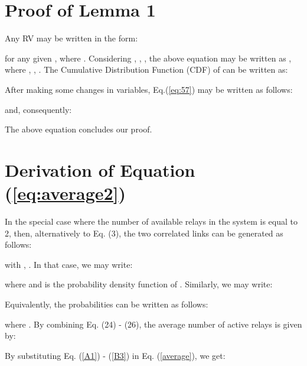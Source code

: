 \documentclass[12pt,draftcls, onecolumn]{IEEEtran}
\begin{document}
\section{Proof of Lemma 1}
\label{a2}

Any RV  may be written in the form:
\vspace{-1pt}
\begingroup

\endgroup
for any given , where . Considering , , , the above equation may be written as ,
\noindent where , , .
The Cumulative Distribution Function (CDF) of  can be written as:
\vspace{-1pt}
\begingroup

\endgroup
After making some changes in variables, Eq.(\ref{eq:57}) may be written as follows:
\vspace{-1em}

\begingroup

\endgroup
and, consequently:
\begingroup

\endgroup

\noindent The above equation concludes our proof.

\section{Derivation of Equation (\ref{eq:average2})}
\label{a5}

In the special case where the number of available relays in the system is equal to 2, then, alternatively to Eq. (3), the two correlated links  can be generated as follows:

\begingroup
{\setlength{\arraycolsep}{0em}
}
\endgroup

\noindent with , . In that case, we may write:

\begingroup
{\setlength{\arraycolsep}{0em}
}
\endgroup

\noindent where  and  is the probability density function of . Similarly, we may write:

\begingroup
{\setlength{\arraycolsep}{0em}
}
\endgroup

\noindent Equivalently, the probabilities  can be written as follows:

\begingroup
{\setlength{\arraycolsep}{0em}
}
\endgroup

\noindent where . By combining Eq. (24) - (26), the average number of active relays is given by:

\begingroup

\endgroup

By substituting Eq. (\ref{A1}) - (\ref{B3}) in Eq.  (\ref{average}), we get:
\end{document}
